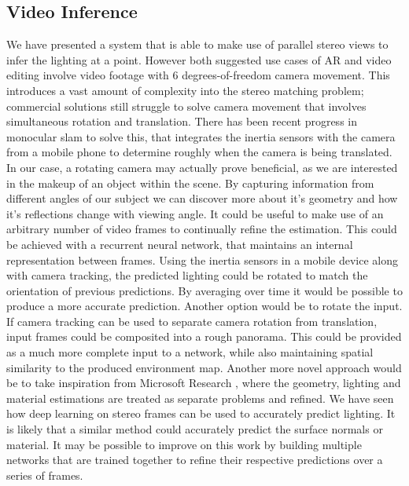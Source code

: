 \documentclass[ %
                    author={Gavin Parker},
                supervisor={Dr. Neill Campbell},
                    degree={MEng},
                     title={Deep Learning for Illumination Estimation from Stereo Images},
                  subtitle={},
                      type={Research},
                      year={2018} ]{dissertation}
\begin{document}
\subsection{Video Inference}
We have presented a system that is able to make use of parallel stereo views to infer the lighting at a point. However both suggested use cases of AR and video editing involve video footage with 6 degrees-of-freedom camera movement. This introduces a vast amount of complexity into the stereo matching problem; commercial solutions still struggle to solve camera movement that involves simultaneous rotation and translation. There has been recent progress in monocular slam to solve this, that integrates the inertia sensors with the camera from a mobile phone to determine roughly when the camera is being translated. In our case, a rotating camera may actually prove beneficial, as we are interested in the makeup of an object within the scene. By capturing information from different angles of our subject we can discover more about it's geometry and how it's reflections change with viewing angle. It could be useful to make use of an arbitrary number of video frames to continually refine the estimation.
\newline
This could be achieved with a recurrent neural network, that maintains an internal representation between frames. Using the inertia sensors in a mobile device along with camera tracking, the predicted lighting could be rotated to match the orientation of previous predictions. By averaging over time it would be possible to produce a more accurate prediction. Another option would be to rotate the input. If camera tracking can be used to separate camera rotation from translation, input frames could be composited into a rough panorama. This could be provided as a much more complete input to a network, while also maintaining spatial similarity to the produced environment map.
\newline
Another more novel approach would be to take inspiration from Microsoft Research \cite{xia}, where the geometry, lighting and material estimations are treated as separate problems and refined. We have seen how deep learning on stereo frames can be used to accurately predict lighting. It is likely that a similar method could accurately predict the surface normals or material. It may be possible to improve on this work by building multiple networks that are trained together to refine their respective predictions over a series of frames.
 
\end{document}

